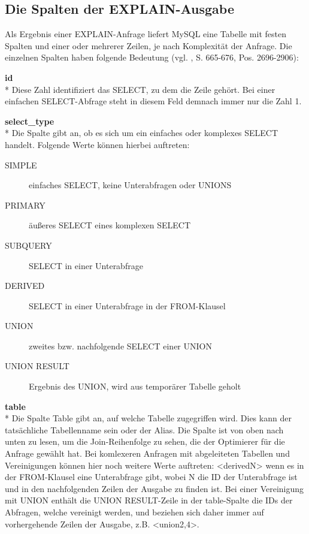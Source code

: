 \subsection{Die Spalten der EXPLAIN-Ausgabe}
Als Ergebnis einer EXPLAIN-Anfrage liefert MySQL eine Tabelle mit festen Spalten und einer oder mehrerer Zeilen, je nach Komplexität der Anfrage. Die einzelnen Spalten haben folgende Bedeutung (vgl. \cite{refman2}, 
\cite{Schwartz2009} S. 665-676, 
\cite{Bradford2011} Pos. 2696-2906):

\textbf{id}\\*
Diese Zahl identifiziert das SELECT, zu dem die Zeile gehört. Bei einer einfachen SELECT-Abfrage steht in diesem Feld demnach immer nur die Zahl 1.

\textbf{select\_type}\\*
Die Spalte gibt an, ob es sich um ein einfaches oder komplexes SELECT handelt. Folgende Werte können hierbei auftreten:
\begin{description}
	\item[SIMPLE] einfaches SELECT, keine Unterabfragen oder UNIONS
	\item[PRIMARY] äußeres SELECT eines komplexen SELECT
	\item[SUBQUERY] SELECT in einer Unterabfrage
	\item[DERIVED] SELECT in einer Unterabfrage in der FROM-Klausel
	\item[UNION] zweites bzw. nachfolgende SELECT einer UNION
	\item[UNION RESULT] Ergebnis des UNION, wird aus temporärer Tabelle geholt
\end{description}

\textbf{table}\\*
Die Spalte Table gibt an, auf welche Tabelle zugegriffen wird. Dies kann der tatsächliche Tabellenname sein oder der Alias. Die Spalte ist von oben nach unten zu lesen, um die Join-Reihenfolge zu sehen, die der Optimierer für die Anfrage gewählt hat.
Bei komlexeren Anfragen mit abgeleiteten Tabellen und Vereinigungen können hier noch weitere Werte auftreten: <derivedN> wenn es in der FROM-Klausel eine Unterabfrage gibt, wobei N die ID der Unterabfrage ist und in den nachfolgenden Zeilen der Ausgabe zu finden ist. Bei einer Vereinigung mit UNION enthält die UNION RESULT-Zeile in der table-Spalte die IDs der Abfragen, welche vereinigt werden, und beziehen sich daher immer auf vorhergehende Zeilen der Ausgabe, z.B. <union2,4>.

